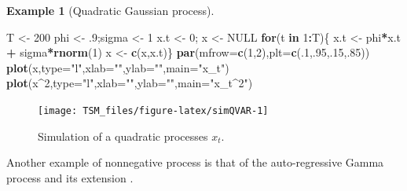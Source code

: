 \documentclass[
  12pt,
]{book}
\newenvironment{Shaded}{\begin{snugshade}}{\end{snugshade}}
\newcommand{\AttributeTok}[1]{\textcolor[rgb]{0.13,0.29,0.53}{#1}}
\newcommand{\ConstantTok}[1]{\textcolor[rgb]{0.56,0.35,0.01}{#1}}
\newcommand{\ControlFlowTok}[1]{\textcolor[rgb]{0.13,0.29,0.53}{\textbf{#1}}}
\newcommand{\DecValTok}[1]{\textcolor[rgb]{0.00,0.00,0.81}{#1}}
\newcommand{\FunctionTok}[1]{\textcolor[rgb]{0.13,0.29,0.53}{\textbf{#1}}}
\newcommand{\NormalTok}[1]{#1}
\newcommand{\OtherTok}[1]{\textcolor[rgb]{0.56,0.35,0.01}{#1}}
\newcommand{\SpecialCharTok}[1]{\textcolor[rgb]{0.81,0.36,0.00}{\textbf{#1}}}
\newcommand{\StringTok}[1]{\textcolor[rgb]{0.31,0.60,0.02}{#1}}
\theoremstyle{definition}
\theoremstyle{definition}
\newtheorem{example}{Example}[chapter]
\theoremstyle{definition}
\theoremstyle{definition}
\theoremstyle{remark}
\begin{document}
\begin{example}[Quadratic Gaussian process]
\begin{Shaded}
\begin{Highlighting}[]
\NormalTok{T }\OtherTok{\textless{}{-}} \DecValTok{200}
\NormalTok{phi }\OtherTok{\textless{}{-}}\NormalTok{ .}\DecValTok{9}\NormalTok{;sigma }\OtherTok{\textless{}{-}} \DecValTok{1}
\NormalTok{x.t }\OtherTok{\textless{}{-}} \DecValTok{0}\NormalTok{; x }\OtherTok{\textless{}{-}} \ConstantTok{NULL}
\ControlFlowTok{for}\NormalTok{(t }\ControlFlowTok{in} \DecValTok{1}\SpecialCharTok{:}\NormalTok{T)\{}
\NormalTok{  x.t }\OtherTok{\textless{}{-}}\NormalTok{ phi}\SpecialCharTok{*}\NormalTok{x.t }\SpecialCharTok{+}\NormalTok{ sigma}\SpecialCharTok{*}\FunctionTok{rnorm}\NormalTok{(}\DecValTok{1}\NormalTok{)}
\NormalTok{  x }\OtherTok{\textless{}{-}} \FunctionTok{c}\NormalTok{(x,x.t)\}}
\FunctionTok{par}\NormalTok{(}\AttributeTok{mfrow=}\FunctionTok{c}\NormalTok{(}\DecValTok{1}\NormalTok{,}\DecValTok{2}\NormalTok{),}\AttributeTok{plt=}\FunctionTok{c}\NormalTok{(.}\DecValTok{1}\NormalTok{,.}\DecValTok{95}\NormalTok{,.}\DecValTok{15}\NormalTok{,.}\DecValTok{85}\NormalTok{))}
\FunctionTok{plot}\NormalTok{(x,}\AttributeTok{type=}\StringTok{"l"}\NormalTok{,}\AttributeTok{xlab=}\StringTok{""}\NormalTok{,}\AttributeTok{ylab=}\StringTok{""}\NormalTok{,}\AttributeTok{main=}\StringTok{"x\_t"}\NormalTok{)}
\FunctionTok{plot}\NormalTok{(x}\SpecialCharTok{\^{}}\DecValTok{2}\NormalTok{,}\AttributeTok{type=}\StringTok{"l"}\NormalTok{,}\AttributeTok{xlab=}\StringTok{""}\NormalTok{,}\AttributeTok{ylab=}\StringTok{""}\NormalTok{,}\AttributeTok{main=}\StringTok{"x\_t\^{}2"}\NormalTok{)}
\end{Highlighting}
\end{Shaded}

\begin{figure}
\texttt{[image: TSM\_files/figure-latex/simQVAR-1]} \caption{Simulation of a quadratic processes $x_t$.}\label{fig:simQVAR}
\end{figure}

\end{example}

Another example of nonnegative process is that of the auto-regressive Gamma process \citep{Gourieroux_Jasiak_2006} and its extension \citep{zarg_2017}.
\end{document}
